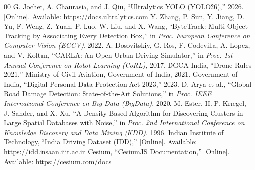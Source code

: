 \documentclass[conference]{IEEEtran}
\begin{document}
\begin{thebibliography}{00}
 G. Jocher, A. Chaurasia, and J. Qiu, ``Ultralytics YOLO (YOLO26),'' 2026. [Online]. Available: https://docs.ultralytics.com
 Y. Zhang, P. Sun, Y. Jiang, D. Yu, F. Weng, Z. Yuan, P. Luo, W. Liu, and X. Wang, ``ByteTrack: Multi-Object Tracking by Associating Every Detection Box,'' in \textit{Proc. European Conference on Computer Vision (ECCV)}, 2022.
 A. Dosovitskiy, G. Ros, F. Codevilla, A. Lopez, and V. Koltun, ``CARLA: An Open Urban Driving Simulator,'' in \textit{Proc. 1st Annual Conference on Robot Learning (CoRL)}, 2017.
 DGCA India, ``Drone Rules 2021,'' Ministry of Civil Aviation, Government of India, 2021.
 Government of India, ``Digital Personal Data Protection Act 2023,'' 2023.
 D. Arya et al., ``Global Road Damage Detection: State-of-the-Art Solutions,'' in \textit{Proc. IEEE International Conference on Big Data (BigData)}, 2020.
 M. Ester, H.-P. Kriegel, J. Sander, and X. Xu, ``A Density-Based Algorithm for Discovering Clusters in Large Spatial Databases with Noise,'' in \textit{Proc. 2nd International Conference on Knowledge Discovery and Data Mining (KDD)}, 1996.
 Indian Institute of Technology, ``India Driving Dataset (IDD),'' [Online]. Available: https://idd.insaan.iiit.ac.in
 Cesium, ``CesiumJS Documentation,'' [Online]. Available: https://cesium.com/docs
\end{thebibliography}
\end{document}
